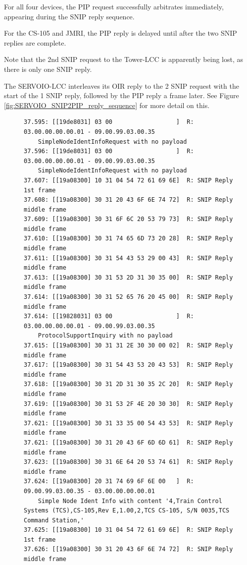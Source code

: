 \documentclass[11pt]{article}
\begin{document}
For all four devices,  
the PIP request successfully arbitrates immediately, appearing during the 
SNIP reply sequence. 

For the CS-105 and JMRI,
the PIP reply is delayed until after the two SNIP replies are complete.

Note that the 2nd SNIP request to the Tower-LCC is apparently
being lost, as there is only one SNIP reply.

The SERVOIO-LCC interleaves its OIR reply to the 2 SNIP request
with the start of the 1 SNIP reply, followed by the PIP reply 
a frame later.
See Figure \ref{fig:SERVOIO_SNIP2PIP_reply_sequence} for more detail on this.


\begin{figure}[!htbp]
\begin{verbatim}
37.595: [[19de8031] 03 00                  ]  R: 03.00.00.00.00.01 - 09.00.99.03.00.35
    SimpleNodeIdentInfoRequest with no payload
37.596: [[19de8031] 03 00                  ]  R: 03.00.00.00.00.01 - 09.00.99.03.00.35
    SimpleNodeIdentInfoRequest with no payload
37.607: [[19a08300] 10 31 04 54 72 61 69 6E]  R: SNIP Reply 1st frame
37.608: [[19a08300] 30 31 20 43 6F 6E 74 72]  R: SNIP Reply middle frame
37.609: [[19a08300] 30 31 6F 6C 20 53 79 73]  R: SNIP Reply middle frame
37.610: [[19a08300] 30 31 74 65 6D 73 20 28]  R: SNIP Reply middle frame
37.611: [[19a08300] 30 31 54 43 53 29 00 43]  R: SNIP Reply middle frame
37.613: [[19a08300] 30 31 53 2D 31 30 35 00]  R: SNIP Reply middle frame
37.614: [[19a08300] 30 31 52 65 76 20 45 00]  R: SNIP Reply middle frame
37.614: [[19828031] 03 00                  ]  R: 03.00.00.00.00.01 - 09.00.99.03.00.35
    ProtocolSupportInquiry with no payload
37.615: [[19a08300] 30 31 31 2E 30 30 00 02]  R: SNIP Reply middle frame
37.617: [[19a08300] 30 31 54 43 53 20 43 53]  R: SNIP Reply middle frame
37.618: [[19a08300] 30 31 2D 31 30 35 2C 20]  R: SNIP Reply middle frame
37.619: [[19a08300] 30 31 53 2F 4E 20 30 30]  R: SNIP Reply middle frame
37.621: [[19a08300] 30 31 33 35 00 54 43 53]  R: SNIP Reply middle frame
37.621: [[19a08300] 30 31 20 43 6F 6D 6D 61]  R: SNIP Reply middle frame
37.623: [[19a08300] 30 31 6E 64 20 53 74 61]  R: SNIP Reply middle frame
37.624: [[19a08300] 20 31 74 69 6F 6E 00   ]  R: 09.00.99.03.00.35 - 03.00.00.00.00.01
    Simple Node Ident Info with content '4,Train Control Systems (TCS),CS-105,Rev E,1.00,2,TCS CS-105, S/N 0035,TCS Command Station,'
37.625: [[19a08300] 10 31 04 54 72 61 69 6E]  R: SNIP Reply 1st frame
37.626: [[19a08300] 30 31 20 43 6F 6E 74 72]  R: SNIP Reply middle frame

\end{verbatim}
\end{figure}
\end{document}

